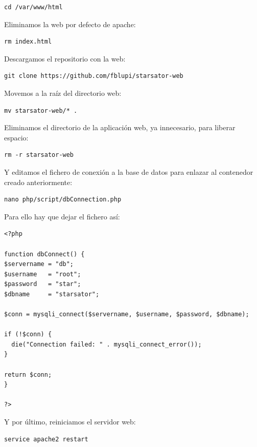 \begin{lstlisting}
cd /var/www/html
\end{lstlisting}

Eliminamos la web por defecto de apache:

\begin{lstlisting}
rm index.html
\end{lstlisting}

Descargamos el repositorio con la web:

\begin{lstlisting}
git clone https://github.com/fblupi/starsator-web
\end{lstlisting}

Movemos a la raíz del directorio web:

\begin{lstlisting}
mv starsator-web/* .
\end{lstlisting}

Eliminamos el directorio de la aplicación web, ya innecesario, para liberar espacio:

\begin{lstlisting}
rm -r starsator-web
\end{lstlisting}

Y editamos el fichero de conexión a la base de datos para enlazar al contenedor creado anteriormente:

\begin{lstlisting}
nano php/script/dbConnection.php
\end{lstlisting}

Para ello hay que dejar el fichero así:

\begin{lstlisting}[style=PHP]
<?php

function dbConnect() {
$servername = "db";
$username   = "root";
$password   = "star";
$dbname     = "starsator";

$conn = mysqli_connect($servername, $username, $password, $dbname);

if (!$conn) {
  die("Connection failed: " . mysqli_connect_error());
}

return $conn;
}

?>
\end{lstlisting}

Y por último, reiniciamos el servidor web:

\begin{lstlisting}
service apache2 restart
\end{lstlisting}

